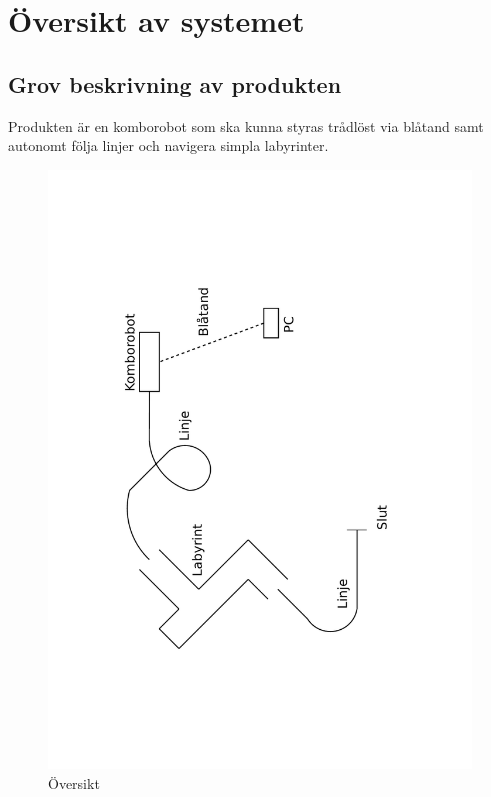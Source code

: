 \documentclass[a4paper,12pt]{article}
\begin{document}
\section{Översikt av systemet}

\subsection{Grov beskrivning av produkten}
Produkten är en komborobot som ska kunna styras trådlöst via blåtand samt autonomt följa linjer och navigera simpla labyrinter.

\begin{figure}[h!]
	\caption{Översikt}
	\begin{center}
		\includegraphics[scale=0.5,angle=270]{Oversikt.pdf}
	\end{center}
\end{figure}
\end{document}

